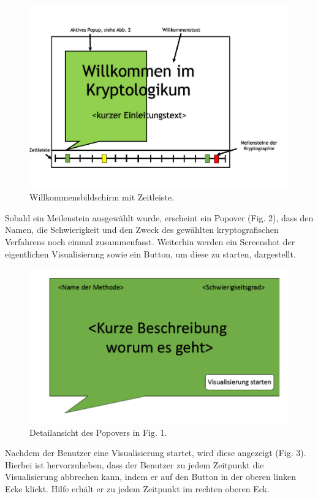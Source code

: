 \documentclass{article}
\begin{document}
\begin{figure}[H]
  \centering
    \includegraphics[width=\textwidth]{resources/ui_walkthrough_start-draft}
  \caption{Willkommensbildschirm mit Zeitleiste.}
\end{figure}

Sobald ein Meilenstein ausgewählt wurde, erscheint ein Popover (Fig. 2), dass den Namen, die Schwierigkeit und den Zweck des gewählten kryptografischen Verfahrens noch einmal zusammenfasst. Weiterhin werden ein Screenshot der eigentlichen Visualisierung sowie ein Button, um diese zu starten, dargestellt.

\begin{figure}[H]
  \centering
    \includegraphics[width=\textwidth]{resources/ui_walkthrough_popover-draft}
  \caption{Detailansicht des Popovers in Fig. 1.}
\end{figure}

Nachdem der Benutzer eine Visualisierung startet, wird diese angezeigt (Fig. 3). Hierbei ist hervorzuheben, dass der Benutzer zu jedem Zeitpunkt die Visualisierung abbrechen kann, indem er auf den Button in der oberen linken Ecke klickt. Hilfe erhält er zu jedem Zeitpunkt im rechten oberen Eck.
\end{document}
